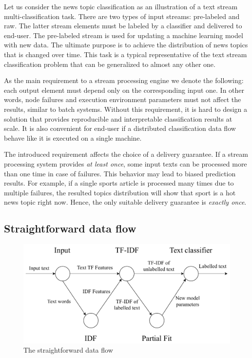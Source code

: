 \label{fs-framework}

Let us consider the news topic classification as an illustration of a text stream multi-classification task. There are two types of input streams: pre-labeled and raw. The latter stream elements must be labeled by a classifier and delivered to end-user. The pre-labeled stream is used for updating a machine learning model with new data. The ultimate purpose is to achieve the distribution of news topics that is changed over time. This task is a typical representative of the text stream classification problem that can be generalized to almost any other one.

As the main requirement to a stream processing engine we denote the following: each output element must depend only on the corresponding input one. In other words, node failures and execution environment parameters must not affect the results, similar to batch systems. Without this requirement, it is hard to design a solution that provides reproducible and interpretable classification results at scale. It is also convenient for end-user if a distributed classification data flow behave like it is executed on a single machine.

The introduced requirement affects the choice of a delivery guarantee. If a stream processing system provides {\em at least once}, some input texts can be processed more than one time in case of failures. This behavior may lead to biased prediction results. For example, if a single sports article is processed many times due to multiple failures, the resulted topics distribution will show that sport is a hot news topic right now. Hence, the only suitable delivery guarantee is {\em exactly once}.

\subsection{Straightforward data flow}

\begin{figure}[htbp]
  \centering
  \includegraphics[scale=0.48]{pics/logical-graph}
  \caption{The straightforward data flow}
  \label {logical_graph}
\end{figure}


